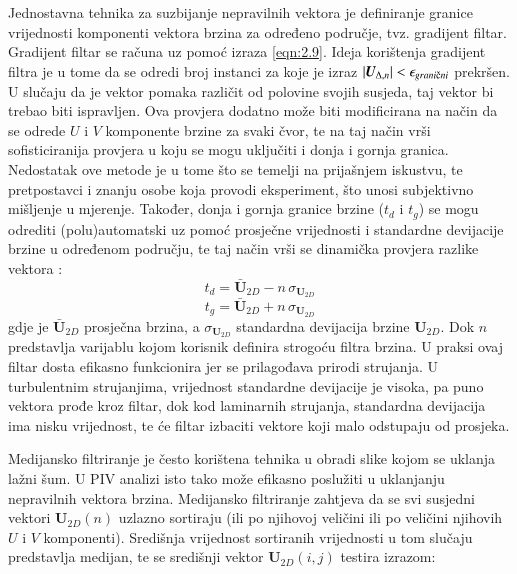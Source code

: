 \begin{description}[style=unboxed,leftmargin=0cm]
	\item[Provjera razlike vektora] Jednostavna tehnika za suzbijanje nepravilnih vektora je definiranje granice vrijednosti komponenti vektora brzina za određeno područje, tvz. gradijent filtar. Gradijent filtar se računa uz pomoć izraza \ref{eqn:2.9}. Ideja korištenja gradijent filtra je u tome da se odredi broj instanci za koje je izraz $|\boldsymbol{U}_{\Delta, n}|< \epsilon_{grani\textup{č}ni}$ prekršen. U slučaju da je vektor pomaka različit od polovine svojih susjeda, taj vektor bi trebao biti ispravljen. Ova provjera dodatno može biti modificirana na način da se odrede $U$ i $V$ komponente brzine za svaki čvor, te na taj način vrši sofisticiranija provjera u koju se mogu uključiti i donja i gornja granica.  Nedostatak ove metode je u tome što se temelji na prijašnjem iskustvu, te pretpostavci i znanju osobe koja provodi eksperiment, što unosi subjektivno mišljenje u mjerenje. Također, donja i gornja granice brzine ($t_{d}$ i $t_{g}$) se mogu odrediti (polu)automatski uz pomoć prosječne vrijednosti i standardne devijacije brzine u određenom području, te taj način vrši se dinamička provjera razlike vektora \cite{thielicke2014_phd}:
	\begin{equation}
		t_{d}=\bar{\boldsymbol{U}}_{2D}-n \, \sigma_{\boldsymbol{U}_{2D}}
		\label{eqn:2.10}
	\end{equation}
	\begin{equation}
		t_{g}=\bar{\boldsymbol{U}}_{2D}+n \, \sigma_{\boldsymbol{U}_{2D}}
		\label{eqn:2.11}
	\end{equation}
	gdje je $\bar{\boldsymbol{U}}_{2D}$ prosječna brzina, a $\sigma_{\boldsymbol{U}_{2D}}$ standardna devijacija brzine $\boldsymbol{U}_{2D}$. Dok $n$ predstavlja varijablu kojom korisnik definira strogoću filtra brzina. U praksi ovaj filtar dosta efikasno funkcionira jer se prilagođava prirodi strujanja. U turbulentnim strujanjima, vrijednost standardne devijacije je visoka, pa puno vektora prođe kroz filtar, dok kod laminarnih strujanja, standardna devijacija ima nisku vrijednost, te će filtar izbaciti vektore koji malo odstupaju od prosjeka.
	\item[Medijan test] Medijansko filtriranje je često korištena tehnika u obradi slike kojom se uklanja lažni šum. U PIV analizi isto tako može efikasno poslužiti u uklanjanju nepravilnih vektora brzina. Medijansko filtriranje zahtjeva da se svi susjedni vektori $\boldsymbol{U}_{2D}(n)$ uzlazno sortiraju (ili po njihovoj veličini ili po veličini njihovih $U$ i $V$ komponenti). Središnja vrijednost sortiranih vrijednosti u tom slučaju predstavlja medijan, te se središnji vektor $\boldsymbol{U}_{2D}(i,j)$ testira izrazom:

\end{description}
